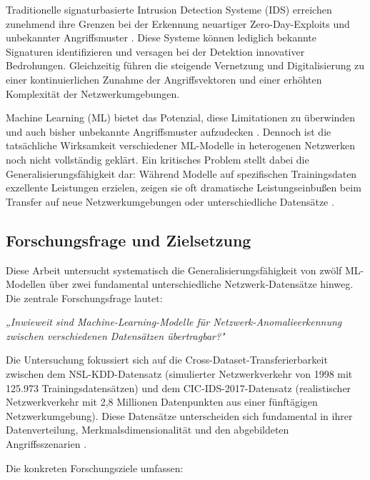 \documentclass[11pt,a4paper]{article}
\begin{document}
    Traditionelle signaturbasierte Intrusion Detection Systeme (IDS) erreichen zunehmend ihre Grenzen bei der Erkennung neuartiger Zero-Day-Exploits und unbekannter Angriffsmuster \parencite{Ring2019,Belavagi2016}. Diese Systeme können lediglich bekannte Signaturen identifizieren und versagen bei der Detektion innovativer Bedrohungen. Gleichzeitig führen die steigende Vernetzung und Digitalisierung zu einer kontinuierlichen Zunahme der Angriffsvektoren und einer erhöhten Komplexität der Netzwerkumgebungen.

    Machine Learning (ML) bietet das Potenzial, diese Limitationen zu überwinden und auch bisher unbekannte Angriffsmuster aufzudecken \parencite{Vinayakumar2019}. Dennoch ist die tatsächliche Wirksamkeit verschiedener ML-Modelle in heterogenen Netzwerken noch nicht vollständig geklärt. Ein kritisches Problem stellt dabei die Generalisierungsfähigkeit dar: Während Modelle auf spezifischen Trainingsdaten exzellente Leistungen erzielen, zeigen sie oft dramatische Leistungseinbußen beim Transfer auf neue Netzwerkumgebungen oder unterschiedliche Datensätze \parencite{Ring2019}.

    \subsection{Forschungsfrage und Zielsetzung}

    Diese Arbeit untersucht systematisch die Generalisierungsfähigkeit von zwölf ML-Modellen über zwei fundamental unterschiedliche Netzwerk-Datensätze hinweg. Die zentrale Forschungsfrage lautet:

    \textit{„Inwieweit sind Machine-Learning-Modelle für Netzwerk-Anomalieerkennung zwischen verschiedenen Datensätzen übertragbar?"}

    Die Untersuchung fokussiert sich auf die Cross-Dataset-Transferierbarkeit zwischen dem NSL-KDD-Datensatz \parencite{NSLKDD2024} (simulierter Netzwerkverkehr von 1998 mit 125.973 Trainingsdatensätzen) und dem CIC-IDS-2017-Datensatz \parencite{CICIDS2017,Sharafaldin2018} (realistischer Netzwerkverkehr mit 2,8 Millionen Datenpunkten aus einer fünftägigen Netzwerkumgebung). Diese Datensätze unterscheiden sich fundamental in ihrer Datenverteilung, Merkmalsdimensionalität und den abgebildeten Angriffsszenarien \parencite{Mourouzis2021}.

    Die konkreten Forschungsziele umfassen:
\end{document}
